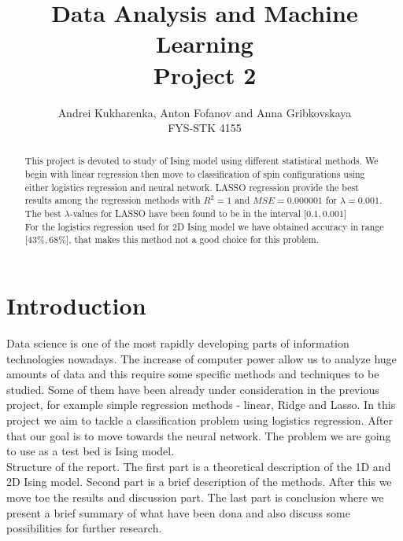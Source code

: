 \documentclass[10pt]{article}
\begin{document}
\setlength\parindent{1pt}
\title{Data Analysis and Machine Learning \\
	Project 2\\ }
\author{Andrei Kukharenka, Anton Fofanov and Anna Gribkovskaya \\  
	FYS-STK 4155 
}
\date{}

\maketitle

\begin{abstract}
	This project is devoted to study of Ising model using different statistical methods. We begin with linear regression then move to classification of spin configurations using either logistics regression and neural network. LASSO regression provide the best results among the regression methods with $R^2=1$ and $MSE=\num{0.000001}$ for $\lambda=\num{0.001}$. The best $\lambda$-values for LASSO have been found to be in the interval $\lbrack \num{0.1} , \num{0.001} \rbrack$\\
	For the logistics regression used for 2D Ising model we have obtained accuracy in range $\lbrack 43\% , 68\% \rbrack$,  that makes this method not a good choice for this problem.

\end{abstract}
\newpage
\tableofcontents
\section{Introduction}

Data science is one of the most rapidly developing parts of information technologies nowadays. The increase of computer power allow us to analyze huge amounts of data and this require some specific methods and techniques to be studied. Some of them have been already under consideration in the previous project, for example simple regression methods - linear, Ridge and Lasso. In this project we aim to tackle a classification problem using logistics regression. After that our goal is to move towards the neural network. The problem we are going to use as a test bed is Ising model. \\

Structure of the report. The first part is a theoretical description of the 1D and 2D Ising model. Second part is a brief description of the methods. After this we move toe the results and discussion part. The last part is conclusion where we present a brief summary of what have been dona and also discuss some possibilities for further research.
\end{document}
